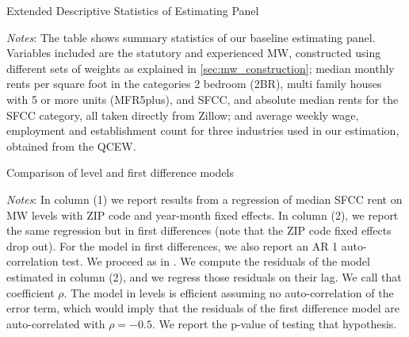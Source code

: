 \begin{table}[h!]
	\caption{Extended Descriptive Statistics of Estimating Panel}
	\label{tab:estimating_panel_stats_long}
	\centering
	
	\begin{minipage}{0.95\textwidth} \footnotesize
		\vspace{3mm} 
		\textit{Notes}: The table shows summary statistics of our baseline estimating panel.
		Variables included are the statutory and experienced MW, constructed using different
		sets of weights as explained in \autoref{sec:mw_construction}; median monthly rents 
		per square foot in the categories 2 bedroom (2BR), multi family houses with 5 or more 
		units (MFR5plus), and SFCC, and absolute median rents for the SFCC category, all taken
		directly from Zillow; and average weekly wage, employment and establishment count 
		for three industries used in our estimation, obtained from the QCEW.
	\end{minipage}
\end{table}

\clearpage
\begin{table}[h!] \centering
	\caption{Comparison of level and first difference models}
	\label{tab:level_auto}
	
	\begin{minipage}{0.95\textwidth} \footnotesize
		\vspace{3mm} 
		\textit{Notes}: In column (1) we report results from a regression of median SFCC rent on 
		MW levels with ZIP code and year-month fixed effects. In column (2), we report the same 
		regression but in first differences (note that the ZIP code  fixed effects drop out). For 
		the model in first differences, we also report an AR 1 auto-correlation test. We proceed 
		as in \parencite[][section 10.6.3]{wooldridge2010}. We compute the residuals of the model 
		estimated in column (2), and we regress those residuals on their lag. We call that 
		coefficient $\rho$. The model in levels is efficient assuming no auto-correlation of the 
		error term, which would imply that the residuals of the first difference model are 
		auto-correlated with $\rho = -0.5$. We report the p-value of testing that hypothesis.
	\end{minipage} 
\end{table}

